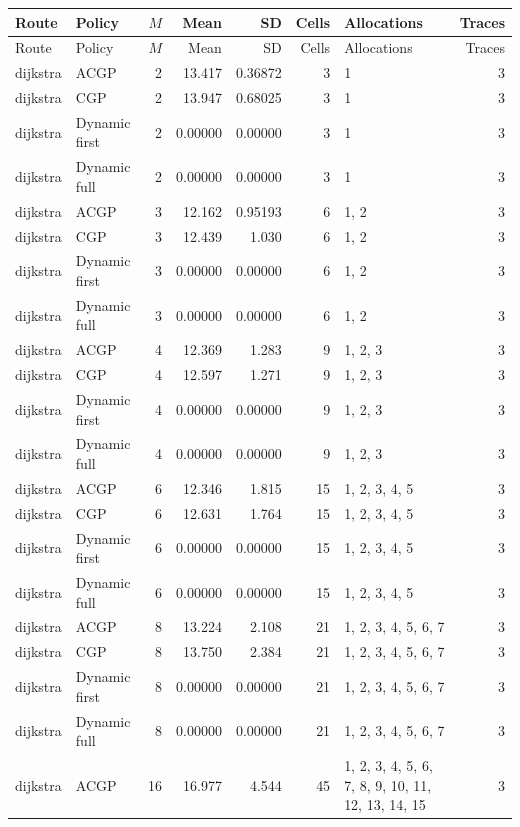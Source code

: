 \documentclass[10pt,a4paper]{article}
\begin{document}
\tiny\setlength{\tabcolsep}{2pt}\begin{longtable}{@{}p{23mm}p{29mm}rrrrp{36mm}r@{}}
\toprule Route & Policy & $M$ & Mean & SD & Cells & Allocations & Traces \\ \midrule\endfirsthead
\toprule Route & Policy & $M$ & Mean & SD & Cells & Allocations & Traces \\ \midrule\endhead
\bottomrule\endfoot
dijkstra & ACGP & 2 & 13.417 & 0.36872 & 3 & 1 & 3 \\
dijkstra & CGP & 2 & 13.947 & 0.68025 & 3 & 1 & 3 \\
dijkstra & Dynamic first & 2 & 0.00000 & 0.00000 & 3 & 1 & 3 \\
dijkstra & Dynamic full & 2 & 0.00000 & 0.00000 & 3 & 1 & 3 \\
dijkstra & ACGP & 3 & 12.162 & 0.95193 & 6 & 1, 2 & 3 \\
dijkstra & CGP & 3 & 12.439 & 1.030 & 6 & 1, 2 & 3 \\
dijkstra & Dynamic first & 3 & 0.00000 & 0.00000 & 6 & 1, 2 & 3 \\
dijkstra & Dynamic full & 3 & 0.00000 & 0.00000 & 6 & 1, 2 & 3 \\
dijkstra & ACGP & 4 & 12.369 & 1.283 & 9 & 1, 2, 3 & 3 \\
dijkstra & CGP & 4 & 12.597 & 1.271 & 9 & 1, 2, 3 & 3 \\
dijkstra & Dynamic first & 4 & 0.00000 & 0.00000 & 9 & 1, 2, 3 & 3 \\
dijkstra & Dynamic full & 4 & 0.00000 & 0.00000 & 9 & 1, 2, 3 & 3 \\
dijkstra & ACGP & 6 & 12.346 & 1.815 & 15 & 1, 2, 3, 4, 5 & 3 \\
dijkstra & CGP & 6 & 12.631 & 1.764 & 15 & 1, 2, 3, 4, 5 & 3 \\
dijkstra & Dynamic first & 6 & 0.00000 & 0.00000 & 15 & 1, 2, 3, 4, 5 & 3 \\
dijkstra & Dynamic full & 6 & 0.00000 & 0.00000 & 15 & 1, 2, 3, 4, 5 & 3 \\
dijkstra & ACGP & 8 & 13.224 & 2.108 & 21 & 1, 2, 3, 4, 5, 6, 7 & 3 \\
dijkstra & CGP & 8 & 13.750 & 2.384 & 21 & 1, 2, 3, 4, 5, 6, 7 & 3 \\
dijkstra & Dynamic first & 8 & 0.00000 & 0.00000 & 21 & 1, 2, 3, 4, 5, 6, 7 & 3 \\
dijkstra & Dynamic full & 8 & 0.00000 & 0.00000 & 21 & 1, 2, 3, 4, 5, 6, 7 & 3 \\
dijkstra & ACGP & 16 & 16.977 & 4.544 & 45 & 1, 2, 3, 4, 5, 6, 7, 8, 9, 10, 11, 12, 13, 14, 15 & 3 \\

\end{longtable}
\end{document}
